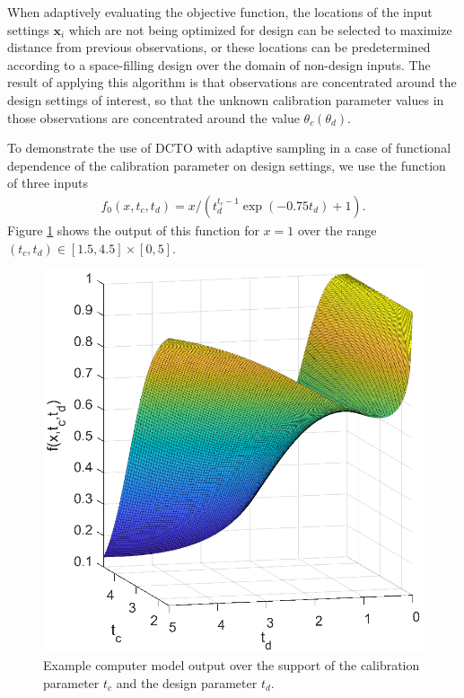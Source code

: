 \documentclass[twocolumn,10pt]{asme2ej}
\begin{document}
%
When adaptively evaluating the objective function, the locations of the input settings $\mathbf x_i$ which are not being optimized for design can be selected to maximize distance from previous observations, or these locations can be predetermined according to a space-filling design over the domain of non-design inputs.
%
The result of applying this algorithm is that observations are concentrated around the design settings of interest, so that the unknown calibration parameter values in those observations are concentrated around the value $\theta_c(\theta_d)$.
%

%
To demonstrate the use of DCTO with adaptive sampling in a case of functional dependence of the calibration parameter on design settings, we use the function of three inputs 
%
\begin{align}
	f_0(x,t_c,t_d) = x / (t_d^{t_c-1}\exp(-0.75t_d)+1). \label{eq:f0}
\end{align}
%
Figure \ref{fig:example_output} shows the output of this function for $x=1$ over the range $(t_c,t_d)\in[1.5,4.5]\times[0,5]$.
%
\begin{figure}
	\centering
	\includegraphics[scale=0.85]{FIG_obj_fn.eps}
	\captionsetup{width=.85\linewidth}
	\caption{Example computer model output over the support of the calibration parameter $t_c$ and the design parameter $t_d$.}
	\label{fig:example_output}
\end{figure}
\end{document}
